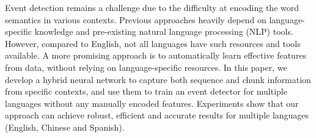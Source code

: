 Event detection remains a challenge due to the difficulty at encoding the word semantics in various contexts. Previous approaches heavily depend on language-specific knowledge and pre-existing natural language processing (NLP) tools. However, compared to English, not all languages have such resources and  tools available. A more promising approach is to automatically learn effective features from data, without relying on language-specific resources. In this paper, we develop a hybrid neural network to capture both sequence and chunk information from specific contexts, and use them to train an event detector for multiple languages without any manually encoded features. Experiments show that our approach can achieve robust, efficient and accurate results for multiple languages (English, Chinese and Spanish).
